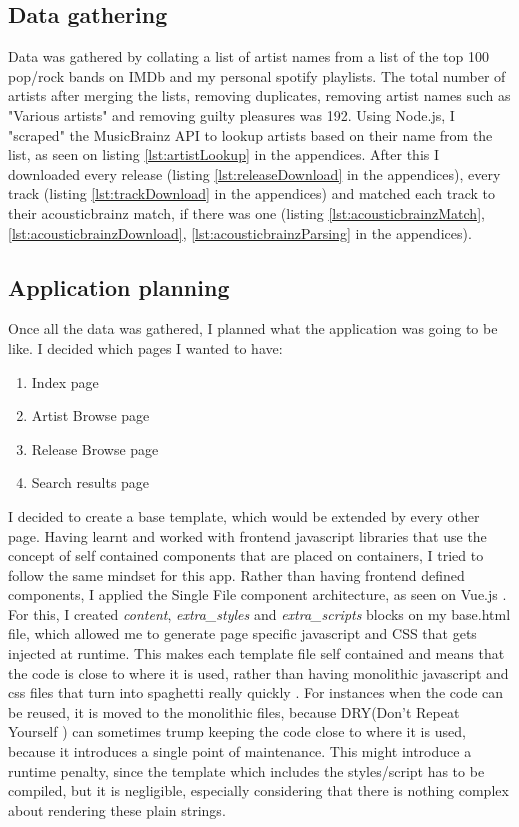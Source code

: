 \documentclass[10pt, a4paper]{article}
\begin{document}
	\subsection{Data gathering}
	Data was gathered by collating a list of artist names from a list of the top 100 pop/rock bands on IMDb \cite{The 100 Greatest Pop/Rock Bands} and my personal spotify playlists.
	The total number of artists after merging the lists, removing duplicates, removing artist names such as "Various artists" and removing guilty pleasures was 192.
	Using Node.js\cite{Node js Foundation}, I "scraped" the MusicBrainz API to lookup artists based on their name from the list, as seen on listing \ref{lst:artistLookup} in the appendices.
	After this I downloaded every release (listing \ref{lst:releaseDownload} in the appendices), every track (listing \ref{lst:trackDownload} in the appendices) and matched each track to their acousticbrainz match, if there was one (listing \ref{lst:acousticbrainzMatch}, \ref{lst:acousticbrainzDownload}, \ref{lst:acousticbrainzParsing} in the appendices).
    
    
	\subsection{Application planning}
	Once all the data was gathered, I planned what the application was going to be like. I decided which pages I wanted to have:

	\begin{enumerate}
	\item Index page
	\item Artist Browse page
	\item Release Browse page
	\item Search results page
	\end{enumerate}
    
    I decided to create a base template, which would be extended by every other page. Having learnt and worked with frontend javascript libraries that use the concept of self contained components that are placed on containers\cite{abramov_presentational_2015}, I tried to follow the same mindset for this app.
    Rather than having frontend defined components, I applied the Single File component architecture, as seen on Vue.js \cite{Vue.js}.
    For this, I created \textit{content}, \textit{extra_styles} and \textit{extra_scripts} blocks on my base.html file, which allowed me to generate page specific javascript and CSS that gets injected at runtime. This makes each template file self contained and means that the code is close to where it is used, rather than having monolithic javascript and css files that turn into spaghetti really quickly \cite{spaghetti}. For instances when the code can be reused, it is moved to the monolithic files, because DRY(Don't Repeat Yourself \cite{hunt2000the}) can sometimes trump keeping the code close to where it is used, because it introduces a single point of maintenance.
    This might introduce a runtime penalty, since the template which includes the styles/script has to be compiled, but it is negligible, especially considering that there is nothing complex about rendering these plain strings.
    
\end{document}

